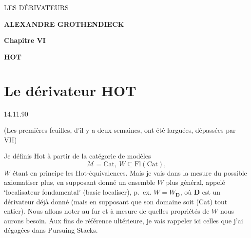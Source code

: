 \dgrchunkbegin

\begin{center}

\vspace*{6cm}

{\Large\textsf{LES DÉRIVATEURS}}

\bigskip

\textbf{ALEXANDRE GROTHENDIECK}

\vspace{2cm}

\textbf{Chapitre VI}

\medskip

\textbf{HOT}
\end{center}

\clearpage

\vspace*{6cm}


\clearpage

\noindent{}

\section*{\normalsize Le dérivateur \textmd{HOT}}

\begin{flushright}
14.11.90
\end{flushright}

\begin{flushright}
(Les premières feuilles, d'il y a deux semaines, ont été larguées, dépassées par VII)
\end{flushright}

\noindent Je définis Hot à partir de la catégorie de modèles
\[
\mathcal{M} = \mathrm{Cat},\ W \subseteq \mathrm{Fl}(\mathrm{Cat}),
\]
$W$ étant en principe les Hot-équivalences. Mais je vais dans la mesure du possible axiomatiser plus, en supposant donné un ensemble $W$ plus général, appelé `localisateur fondamental' (basic localiser), p.~ex. $W = W_{\mathbf{D}}$, où $\mathbf{D}$ est un dérivateur déjà donné (mais en supposant que son domaine soit (Cat) tout entier). Nous allons noter au fur et à mesure de quelles propriétés de $W$ nous aurons besoin. Aux fins de référence ultérieure, je vais rappeler ici celles que j'ai dégagées dans Pursuing Stacks.

